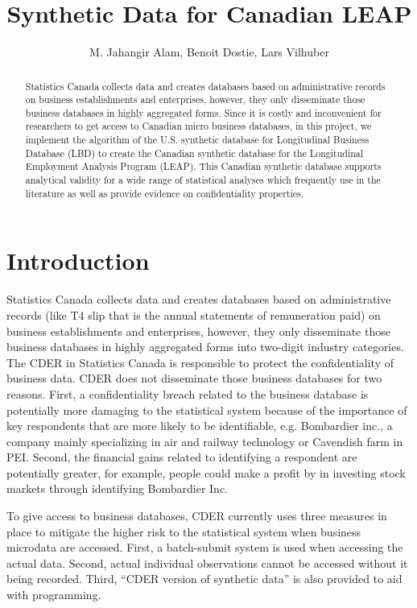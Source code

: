 \documentclass{article}
\title{Synthetic Data for Canadian LEAP}
\author{M. Jahangir Alam, Benoit Dostie, Lars Vilhuber}
\begin{document}
\maketitle
{}
\begin{abstract}
\noindent
Statistics Canada collects data and creates databases based on administrative records on business establishments and enterprises, however, they only disseminate those business databases in highly aggregated forms. Since it is costly and inconvenient for researchers to get access to Canadian micro business databases, in this project, we implement the algorithm of the U.S. synthetic database for Longitudinal Business Database (LBD) to create the Canadian synthetic database for the Longitudinal Employment Analysis Program (LEAP). This Canadian synthetic database supports analytical validity for a wide range of statistical analyses which frequently use in the literature as well as provide evidence on confidentiality properties.

\end{abstract}
\newpage
\tableofcontents
\newpage
\section{Introduction}
Statistics Canada collects data and creates databases based on administrative records (like T4 slip that is the annual statements of remuneration paid) on business establishments and enterprises, however, they only disseminate those business databases in highly aggregated forms into two-digit industry categories. The \acf{CDER} in Statistics Canada is responsible to protect the confidentiality of business data. \ac{CDER} does not disseminate those business databases for two reasons. First, a confidentiality breach related to the business database is potentially more damaging to the statistical system because of the importance of key respondents that are more likely to be identifiable, e.g. Bombardier inc., a company mainly specializing in air and railway technology or Cavendish farm in \ac{PEI}. Second, the financial gains related to identifying a respondent are potentially greater, for example, people could make a profit by in investing stock markets through identifying Bombardier Inc.  

To give access to business databases, CDER currently uses three measures in place to mitigate the higher risk to the statistical system when business microdata are accessed. First, a batch-submit system is used when accessing the actual data. Second, actual individual observations cannot be accessed without it being recorded. Third, ``CDER version of synthetic data'' is also provided to aid with programming. 
\end{document}
